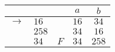 \begin{tabular}{clc|cc}
&&&$a$&$b$\\\hline
$\rightarrow$	&$16$&		&$16$&$34$\\
		&$258$&		&$34$&$16$\\
		&$34$&$F$	&$34$&$258$
\end{tabular}

